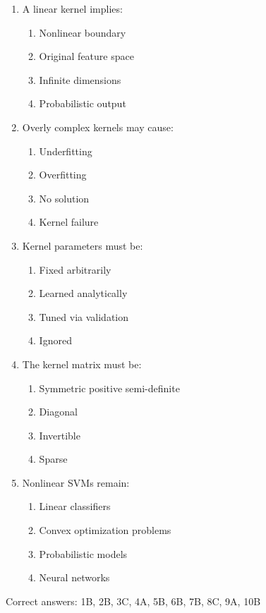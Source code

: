 \documentclass{article}
\begin{document}
\begin{enumerate}
		\item A linear kernel implies:
		\begin{enumerate}
			\item Nonlinear boundary
			\item Original feature space
			\item Infinite dimensions
			\item Probabilistic output
		\end{enumerate}
		
		\item Overly complex kernels may cause:
		\begin{enumerate}
			\item Underfitting
			\item Overfitting
			\item No solution
			\item Kernel failure
		\end{enumerate}
		
		\item Kernel parameters must be:
		\begin{enumerate}
			\item Fixed arbitrarily
			\item Learned analytically
			\item Tuned via validation
			\item Ignored
		\end{enumerate}
		
		\item The kernel matrix must be:
		\begin{enumerate}
			\item Symmetric positive semi-definite
			\item Diagonal
			\item Invertible
			\item Sparse
		\end{enumerate}
		
		\item Nonlinear SVMs remain:
		\begin{enumerate}
			\item Linear classifiers
			\item Convex optimization problems
			\item Probabilistic models
			\item Neural networks
		\end{enumerate}
	\end{enumerate}
	
	Correct answers: 1B, 2B, 3C, 4A, 5B, 6B, 7B, 8C, 9A, 10B
	
\end{document}
